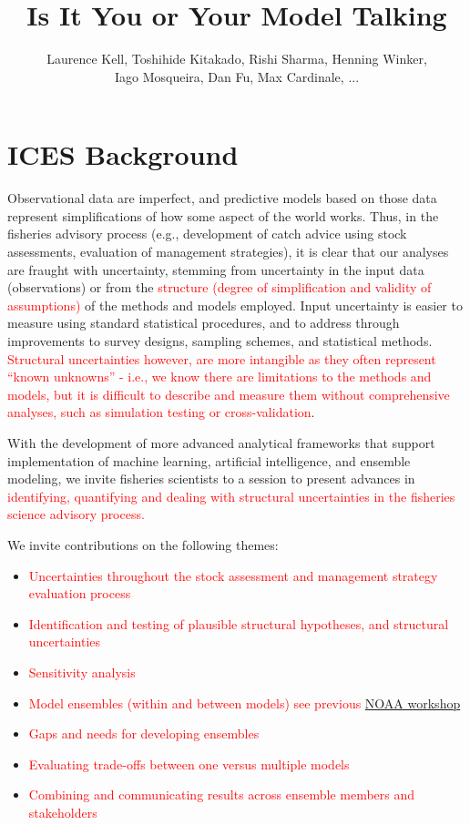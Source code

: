 \documentclass[a4paper]{article}
\title{Is It You or Your Model Talking}
\author{Laurence Kell, Toshihide Kitakado, Rishi Sharma, Henning Winker, \\ Iago Mosqueira, Dan Fu, Max Cardinale, ...}
\newcommand{\laurie}{\textcolor{red}}
\begin{document}
\section*{ICES Background}

Observational data are imperfect, and predictive models based on those data represent simplifications of how some aspect of the world works. Thus, in the fisheries advisory process (e.g., development of catch advice using stock assessments, evaluation of management strategies), it is clear that our analyses are fraught with uncertainty, stemming from uncertainty in the input data (observations) or from the \laurie{structure (degree of simplification and validity of assumptions)} of the methods and models employed. Input uncertainty is easier to measure using standard statistical procedures, and to address through improvements to survey designs, sampling schemes, and statistical methods. \laurie{Structural uncertainties however, are more intangible as they often represent “known unknowns” - i.e., we know there are limitations to the methods and models, but it is difficult to describe and measure them without comprehensive analyses, such as simulation testing or cross-validation}.

With the development of more advanced analytical frameworks that support implementation of  machine learning, artificial intelligence, and ensemble modeling, we invite fisheries scientists to a session to present advances in \laurie{identifying, quantifying and dealing with structural uncertainties in the fisheries science advisory process.}

We invite contributions on the following themes:

\begin{itemize}
    \item \laurie{Uncertainties throughout the stock assessment and management strategy evaluation process}
    \item \laurie{Identification and testing of plausible structural hypotheses, and structural uncertainties}
    \item \laurie{Sensitivity analysis}
    \item \laurie{Model ensembles (within and between models) see previous \href{ https://www.fisheries.noaa.gov/national/population-assessments/noaa-fisheries-13th-national-stock-assessment-workshop-report-released}{NOAA workshop} }
    \item \laurie{Gaps and needs for developing ensembles}
    \item \laurie{Evaluating trade-offs between one versus multiple models}
    \item \laurie{Combining and communicating results across ensemble members and stakeholders}
\end{itemize}
\end{document}

